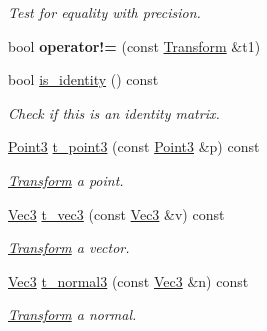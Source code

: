 \begin{DoxyCompactItemize}
\begin{DoxyCompactList}\small\item\em Test for equality with precision. \end{DoxyCompactList}\item 
\mbox{\label{classomg_1_1_transform_aab6f9ac55ff825731c75e4517eeafa3e}} 
bool {\bfseries operator!=} (const \mbox{\hyperlink{classomg_1_1_transform}{Transform}} \&t1)
\item 
\mbox{\label{classomg_1_1_transform_a55a68835062e9c14de477645b22697ec}} 
bool \mbox{\hyperlink{classomg_1_1_transform_a55a68835062e9c14de477645b22697ec}{is\+\_\+identity}} () const
\begin{DoxyCompactList}\small\item\em Check if this is an identity matrix. \end{DoxyCompactList}\item 
\mbox{\hyperlink{namespaceomg_af85242d35fdacf829d32a6f9b95f3e35}{Point3}} \mbox{\hyperlink{classomg_1_1_transform_a79a0ead7866a67287ce3b26ad318ef51}{t\+\_\+point3}} (const \mbox{\hyperlink{namespaceomg_af85242d35fdacf829d32a6f9b95f3e35}{Point3}} \&p) const
\begin{DoxyCompactList}\small\item\em \mbox{\hyperlink{classomg_1_1_transform}{Transform}} a point. \end{DoxyCompactList}\item 
\mbox{\hyperlink{namespaceomg_a45a9482677fee9933ff369b49894e316}{Vec3}} \mbox{\hyperlink{classomg_1_1_transform_ae8e4083fbf3d02114e6dc7a21019b3f2}{t\+\_\+vec3}} (const \mbox{\hyperlink{namespaceomg_a45a9482677fee9933ff369b49894e316}{Vec3}} \&v) const
\begin{DoxyCompactList}\small\item\em \mbox{\hyperlink{classomg_1_1_transform}{Transform}} a vector. \end{DoxyCompactList}\item 
\mbox{\hyperlink{namespaceomg_a45a9482677fee9933ff369b49894e316}{Vec3}} \mbox{\hyperlink{classomg_1_1_transform_a3b9a9ce03a3eeeaac14c6393c50dfcd9}{t\+\_\+normal3}} (const \mbox{\hyperlink{namespaceomg_a45a9482677fee9933ff369b49894e316}{Vec3}} \&n) const
\begin{DoxyCompactList}\small\item\em \mbox{\hyperlink{classomg_1_1_transform}{Transform}} a normal. \end{DoxyCompactList}\item 

\end{DoxyCompactItemize}
